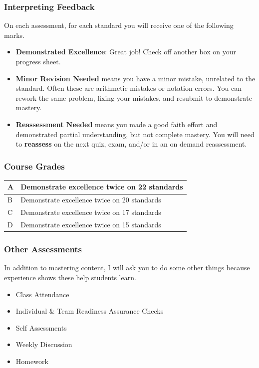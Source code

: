 \documentclass[aspectration=1610]{beamer}
\begin{document}
\begin{frame}\frametitle{Interpreting Feedback}
On each assessment, for each standard you will receive one of the following marks.
\begin{itemize}
\item {\bf Demonstrated Excellence}: Great job!  Check off another box on your progress sheet.
\item {\bf Minor Revision Needed} means you have a minor mistake, unrelated to the standard. Often these are arithmetic mistakes or notation errors. You can rework the same problem, fixing your mistakes, and resubmit to demonstrate mastery.
\item {\bf Reassessment Needed} means you made a good faith effort and demonstrated
      partial understanding, but not complete mastery. You will need to \textbf{reassess} on the next quiz, exam, and/or in an on demand reassessment.
\end{itemize}

\vspace{0.2in}

\end{frame}




\begin{frame}\frametitle{Course Grades}

\begin{center}
\begin{tabular}{ll} \hline
A & Demonstrate excellence twice on 22 standards\\ \hline
B & Demonstrate excellence twice on 20 standards\\ \hline
C & Demonstrate excellence twice on 17 standards\\ \hline
D & Demonstrate excellence twice on 15 standards\\ \hline
\end{tabular}
\end{center}

\end{frame}


\begin{frame}\frametitle{Other Assessments}
In addition to mastering content, I will ask you to do some other things because experience shows these help students learn.
\begin{itemize}
\item Class Attendance
\item Individual \& Team Readiness Assurance Checks
\item Self Assessments
\item Weekly Discussion
\item Homework
\end{itemize}
\end{frame}
\end{document}
